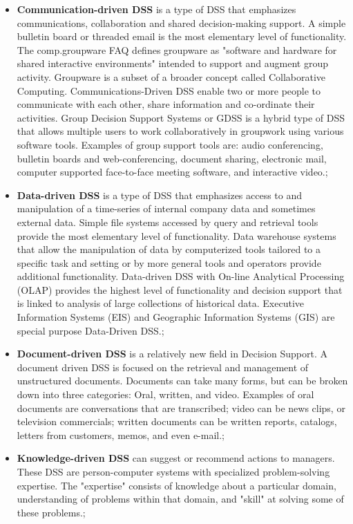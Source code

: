 \documentclass[12pt, oneside]{report}
\begin{document}
\begin {itemize}
\item \textbf{Communication-driven DSS} is a type of DSS that emphasizes communications, collaboration and shared decision-making support. A simple bulletin board or threaded email is the most elementary level of functionality. The comp.groupware FAQ defines groupware as "software and hardware for shared interactive environments" intended to support and augment group activity. Groupware is a subset of a broader concept called Collaborative Computing. Communications-Driven DSS enable two or more people to communicate with each other, share information and co-ordinate their activities. Group Decision Support Systems or GDSS is a hybrid type of DSS that allows multiple users to work collaboratively in groupwork using various software tools. Examples of group support tools are: audio conferencing, bulletin boards and web-conferencing, document sharing, electronic mail, computer supported face-to-face meeting software, and interactive video.; 
\item \textbf{Data-driven DSS} is a type of DSS that emphasizes access to and manipulation of a time-series of internal company data and sometimes external data. Simple file systems accessed by query and retrieval tools provide the most elementary level of functionality. Data warehouse systems that allow the manipulation of data by computerized tools tailored to a specific task and setting or by more general tools and operators provide additional functionality. Data-driven DSS with On-line Analytical Processing (OLAP) provides the highest level of functionality and decision support that is linked to analysis of large collections of historical data. Executive Information Systems (EIS) and Geographic Information Systems (GIS) are special purpose Data-Driven DSS.;
\item \textbf{Document-driven DSS} is a relatively new field in Decision Support. A document driven DSS is focused on the retrieval and management of unstructured documents. Documents can take many forms, but can be broken down into three categories: Oral, written, and video. Examples of oral documents are conversations that are transcribed; video can be news clips, or television commercials; written documents can be written reports, catalogs, letters from customers, memos, and even e-mail.;
\item \textbf{Knowledge-driven DSS} can suggest or recommend actions to managers. These DSS are person-computer systems with specialized problem-solving expertise. The "expertise" consists of knowledge about a particular domain, understanding of problems within that domain, and "skill" at solving some of these problems.;

\end{itemize}
\end{document}
